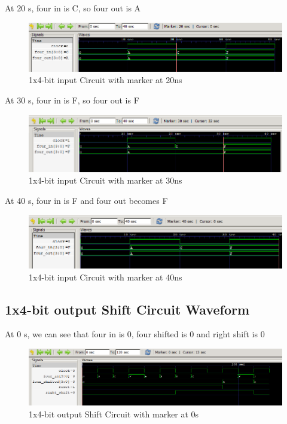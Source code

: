 \documentclass[12pt]{article}
\begin{document}
At 20 s, four in is C, so four out is A
\begin{figure}[h]
    \centering
    \includegraphics[width = 1.0\textwidth]{figs/Input20.png}
    \caption{1x4-bit input Circuit with marker at 20ns}
    \label{fig:enter-label}
\end{figure}

At 30 s, four in is F, so four out is F
\begin{figure}[h]
    \centering
    \includegraphics[width = 1.0\textwidth]{figs/Input30.png}
    \caption{1x4-bit input Circuit with marker at 30ns}
    \label{fig:enter-label}
\end{figure}

\newpage

At 40 s, four in is F and four out becomes F
\begin{figure}[h]
    \centering
    \includegraphics[width = 1.0\textwidth]{figs/Input40.png}
    \caption{1x4-bit input Circuit with marker at 40ns}
    \label{fig:enter-label}
\end{figure}


\subsection{1x4-bit output Shift Circuit Waveform}

At 0 s, we can see that four in is 0, four shifted is 0 and right shift is 0
\begin{figure}[h]
    \centering
    \includegraphics[width = 1.0\textwidth]{figs/Shift0.png}
    \caption{1x4-bit output Shift Circuit with marker at 0s}
    \label{fig:enter-label}
\end{figure}
\end{document}

